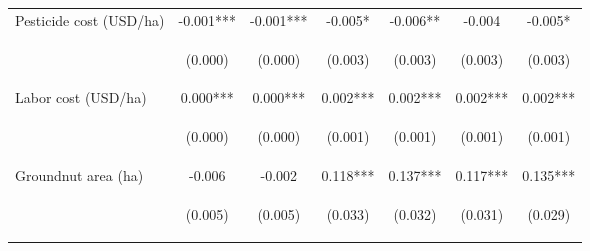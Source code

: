 \begin{center}
\begin{tabular}{lcccccc}
Pesticide cost (USD/ha) & -0.001*** & -0.001*** & -0.005* & -0.006** & -0.004 & -0.005* \\
\vspace{4pt} & \begin{footnotesize}(0.000)\end{footnotesize} & \begin{footnotesize}(0.000)\end{footnotesize} & \begin{footnotesize}(0.003)\end{footnotesize} & \begin{footnotesize}(0.003)\end{footnotesize} & \begin{footnotesize}(0.003)\end{footnotesize} & \begin{footnotesize}(0.003)\end{footnotesize} \\
Labor cost (USD/ha) & 0.000*** & 0.000*** & 0.002*** & 0.002*** & 0.002*** & 0.002*** \\
\vspace{4pt} & \begin{footnotesize}(0.000)\end{footnotesize} & \begin{footnotesize}(0.000)\end{footnotesize} & \begin{footnotesize}(0.001)\end{footnotesize} & \begin{footnotesize}(0.001)\end{footnotesize} & \begin{footnotesize}(0.001)\end{footnotesize} & \begin{footnotesize}(0.001)\end{footnotesize} \\
Groundnut area (ha) & -0.006 & -0.002 & 0.118*** & 0.137*** & 0.117*** & 0.135*** \\
\vspace{4pt} & \begin{footnotesize}(0.005)\end{footnotesize} & \begin{footnotesize}(0.005)\end{footnotesize} & \begin{footnotesize}(0.033)\end{footnotesize} & \begin{footnotesize}(0.032)\end{footnotesize} & \begin{footnotesize}(0.031)\end{footnotesize} & \begin{footnotesize}(0.029)\end{footnotesize} \\

\end{tabular}
\end{center}
